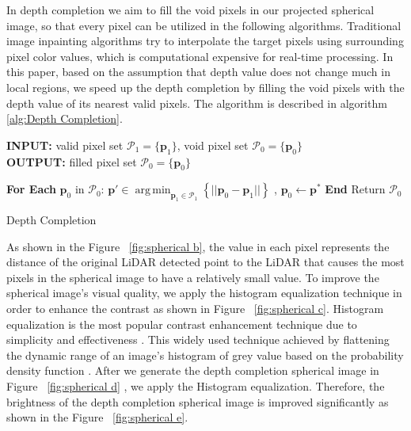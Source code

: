 \documentclass[sigconf]{acmart}
\providecommand{\SetAlgoLined}{\SetLine}
\DeclareMathOperator*{\argmin}{arg\,min}
\begin{document}
In depth completion we aim to fill the void pixels in our projected spherical image, so that every pixel can be utilized in the following algorithms. Traditional image inpainting algorithms try to interpolate the target pixels using surrounding pixel color values, which is computational expensive for real-time processing. In this paper, based on the assumption that depth value does not change much in local regions, we speed up the depth completion by filling the void pixels with the depth value of its nearest valid pixels. The algorithm is described in algorithm \ref{alg:Depth Completion}. 
\begin{algorithm}[t]\footnotesize
	\SetAlgoLined
	\begin{flushleft}

     \textbf{INPUT:} valid pixel set $\mathcal{P}_1 = \{\mathbf{p}_1\}$, void pixel set $\mathcal{P}_0 = \{\mathbf{p}_0\}$\\
	 \textbf{OUTPUT:} filled pixel set $\mathcal{P}_0 = \{\mathbf{p}_0\}$\\
	\end{flushleft}
    \begin{algorithmic}[1]
    \State \textbf{For Each} $\mathbf{p}_0$ in $ \mathcal{P}_0 $:
    \State \quad  $\mathbf{p}' \in \argmin_{\mathbf{p}_1\in \mathcal{P}_1}\left\{||\mathbf{p}_0 - \mathbf{p}_1||\right\}$
,   \State \quad  $\mathbf{p}_0 \leftarrow \mathbf{p}^*$
    \State \textbf{End}
    \State Return $\mathcal{P}_0$
    
    \end{algorithmic}
	\caption{\footnotesize Depth Completion}\label{alg:Depth Completion}
\end{algorithm}



As shown in the Figure ~\ref{fig:spherical b}, the value in each pixel represents the distance of the original LiDAR detected point to the LiDAR that causes the most pixels in the spherical image to have a relatively small value. To improve the spherical image’s visual quality, we apply the histogram equalization technique in order to enhance the contrast as shown in Figure ~\ref{fig:spherical c}. Histogram equalization is the most popular contrast enhancement technique due to simplicity and effectiveness \cite{2008digital}. This widely used technique achieved by flattening the dynamic range of an image’s histogram of grey value based on the probability density function \cite{contrastenhancement}. After we generate the depth completion spherical image in Figure ~\ref{fig:spherical d} , we apply the Histogram equalization. Therefore, the brightness of the depth completion spherical image is improved significantly as shown in the Figure ~\ref{fig:spherical e}.
\end{document}
